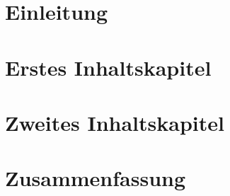 \chapter{Einleitung}
	

\chapter{Erstes Inhaltskapitel}
	

\chapter{Zweites Inhaltskapitel}
	

\chapter{Zusammenfassung}
	
